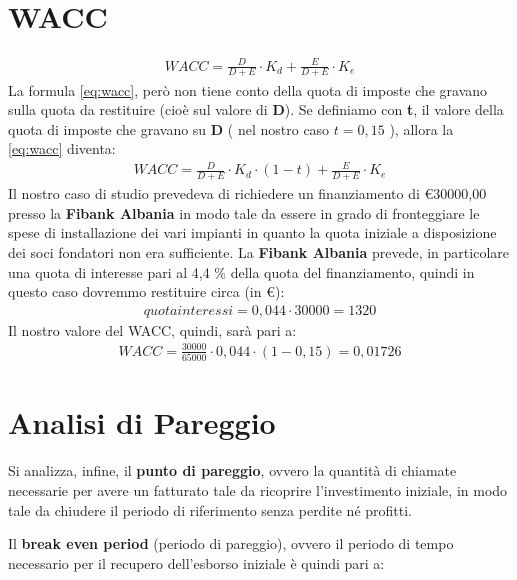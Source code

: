 \section[WACC]{WACC}
	\begin{equation}
	\label{eq:wacc}
	\begin{split}
		WACC = \frac{D}{D+E} \cdot K_d + \frac{E}{D+E} \cdot K_e 
	\end{split}
	\end{equation}
	La formula \ref{eq:wacc}, però non tiene conto della quota di imposte che gravano sulla quota da restituire (cioè sul valore di \textbf{D}). \newline Se definiamo con \textbf{t}, il valore della quota di imposte che gravano su \textbf{D} ( nel nostro caso $ t = 0,15 $ ), allora la \ref{eq:wacc} diventa:
	\begin{equation}
	\label{eq:wacc_tax}
	\begin{split}
		WACC = \frac{D}{D+E} \cdot K_d \cdot ( 1 - t ) + \frac{E}{D+E} \cdot K_e 
	\end{split}
	\end{equation}	
	Il nostro caso di studio prevedeva di richiedere un finanziamento di \euro 30000,00 presso la \textbf{\ac{Fibank Albania}} in modo tale da essere in grado di fronteggiare le spese di installazione dei vari impianti in quanto la quota iniziale a disposizione dei soci fondatori non era sufficiente.
\newline
La \textbf{\ac{Fibank Albania}} prevede, in particolare una quota di interesse pari al 4,4 \% della quota del finanziamento, quindi in questo caso dovremmo restituire circa (in \euro):
	\begin{equation}
	\label{eq:interessi_fibank}
	\begin{split}
		quota interessi = 0,044 \cdot 30000 = 1320 
	\end{split}
	\end{equation}	
Il nostro valore del \ac{WACC}, quindi, sarà pari a:
	\begin{equation}
	\label{eq:wacc_tax_value}
	\begin{split}
		WACC = \frac{30000}{65000} \cdot 0,044 \cdot ( 1 - 0,15 ) = 0,01726 
	\end{split}
	\end{equation}	

\section[Analisi di Pareggio]{Analisi di Pareggio}
Si analizza, infine, il \textbf{punto di pareggio}, ovvero la quantità di chiamate necessarie per avere un fatturato tale da ricoprire l'investimento iniziale, in modo tale da chiudere il periodo di riferimento senza perdite né profitti.

Il \textbf{break even period} (periodo di pareggio), ovvero il periodo di tempo necessario per il recupero dell'esborso iniziale è quindi pari a:   	